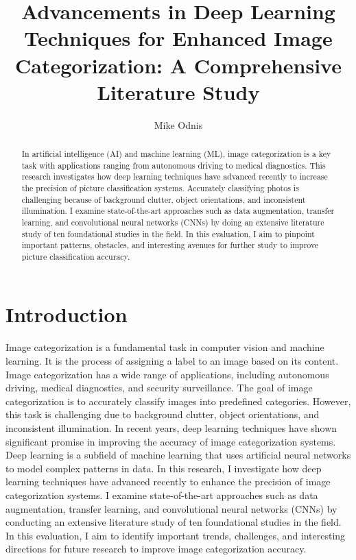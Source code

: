 \documentclass[journal]{IEEEtran}
\title{Advancements in Deep Learning Techniques for Enhanced Image Categorization: A Comprehensive Literature Study}
\author[1]{Mike Odnis}
\affil[1]{Department of Computer Science, State University of New York, Farmingdale State College}
\date{}
\begin{document}
\maketitle
\begin{abstract}
In artificial intelligence (AI) and machine learning (ML), image categorization is a key task with applications ranging from autonomous driving to medical diagnostics. This research investigates how deep learning techniques have advanced recently to increase the precision of picture classification systems. Accurately classifying photos is challenging because of background clutter, object orientations, and inconsistent illumination. I examine state-of-the-art approaches such as data augmentation, transfer learning, and convolutional neural networks (CNNs) by doing an extensive literature study of ten foundational studies in the field. In this evaluation, I aim to pinpoint important patterns, obstacles, and interesting avenues for further study to improve picture classification accuracy.
\end{abstract}

\section{Introduction}
\paragraph{} Image categorization is a fundamental task in computer vision and machine learning. It is the process of assigning a label to an image based on its content. Image categorization has a wide range of applications, including autonomous driving, medical diagnostics, and security surveillance. The goal of image categorization is to accurately classify images into predefined categories. However, this task is challenging due to background clutter, object orientations, and inconsistent illumination. In recent years, deep learning techniques have shown significant promise in improving the accuracy of image categorization systems. Deep learning is a subfield of machine learning that uses artificial neural networks to model complex patterns in data. In this research, I investigate how deep learning techniques have advanced recently to enhance the precision of image categorization systems. I examine state-of-the-art approaches such as data augmentation, transfer learning, and convolutional neural networks (CNNs) by conducting an extensive literature study of ten foundational studies in the field. In this evaluation, I aim to identify important trends, challenges, and interesting directions for future research to improve image categorization accuracy.
\end{document}
